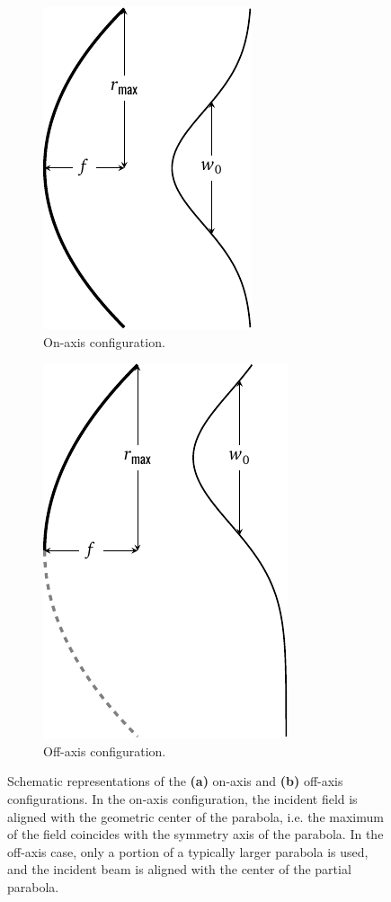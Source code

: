 \documentclass[11pt,SymmetricalJury]{inrsthesis/inrsthesis}
\begin{document}
\begin{figure}
  \centering
  \begin{subfigure}[t]{0.49\textwidth}
    \centering
    \includegraphics{figs/onaxis-parabola.pdf}
    \caption{On-axis configuration.}
    \label{fig:fwm.on-axis-geometry}
  \end{subfigure}
  \hfill
  \begin{subfigure}[t]{0.49\textwidth}
    \centering
    \includegraphics{figs/offaxis-parabola.pdf}
    \caption{Off-axis configuration.}
    \label{fig:fwm.off-axis-geometry}
  \end{subfigure}
  \caption[Schematic representation of the on- and off-axis configurations.]
          {Schematic representations of the \textbf{(a)} on-axis and \textbf{(b)}
          off-axis configurations. In the on-axis configuration, the incident field is aligned with
          the geometric center of the parabola, i.e. the maximum of the field coincides with
          the symmetry axis of the parabola. In the off-axis case, only a portion of a typically
          larger parabola is used, and the incident beam is aligned with the center of the partial
          parabola.}
  \label{fig:fwm.geometry-of-off-axis-setup}
\end{figure}
\end{document}
